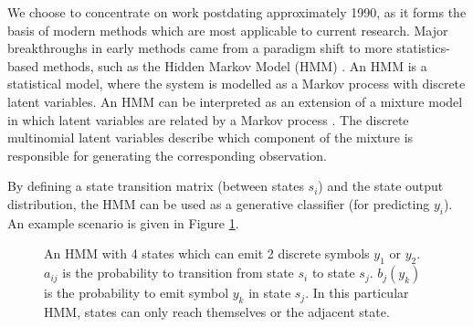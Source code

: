 \documentclass[12pt]{llncs}
\begin{document}
We choose to concentrate on work postdating approximately 1990, as it forms the basis of modern methods which are most applicable to current research. Major breakthroughs in early methods came from a paradigm shift to more statistics-based methods, such as the Hidden Markov Model (HMM) \cite{juang2005automatic}. An HMM is a statistical model, where the system is modelled as a Markov process with discrete latent variables. An HMM can be interpreted as an extension of a mixture model \cite{lindsay1995mixture} in which latent variables are related by a Markov process \cite{bishop2006pattern}. The discrete multinomial latent variables describe which component of the mixture is responsible for generating the corresponding observation.

By defining a state transition matrix (between states $s_i$) and the state output distribution, the HMM can be used as a generative classifier (for predicting $y_i$). An example scenario is given in Figure \ref{fig:HMM}.

\begin{figure}[htbp]
\begin{center}
\end{center}
\caption{An HMM with 4 states which can emit 2 discrete symbols $y_1$ or $y_2$.
$a_{ij}$ is the probability to transition from state $s_i$ to state $s_j$.
$b_j(y_k)$ is the probability to emit symbol $y_k$ in state $s_j$.
In this particular HMM, states can only reach themselves or the adjacent state.}
\label{fig:HMM}
\end{figure}
\end{document}
